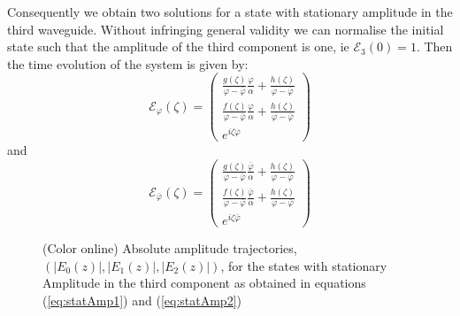 \documentclass[9pt,twocolumn,twoside]{osajnl}
\begin{document}
Consequently we obtain two solutions for a state with stationary amplitude in the third waveguide.
 Without infringing general validity we can normalise the initial state such that the amplitude of the third component is one, ie $\mathcal{E}_3(0)=1$.
 Then the time evolution of the system is given by:
\begin{equation} \label{eq:statAmp1}
\mathcal{E}_{\varphi}(\zeta)=\left( \begin{array}{c}
\frac{g(\zeta)}{\varphi -\bar{\varphi}}\frac{\varphi}{\alpha}+\frac{h(\zeta)}{\varphi -\bar{\varphi}} \\
\frac{f(\zeta)}{\varphi -\bar{\varphi}}\frac{\varphi}{\alpha}+\frac{h(\zeta)}{\varphi -\bar{\varphi}} \\
e^{i\zeta\varphi}
\end{array} \right)	
\end{equation}
and
\begin{equation} \label{eq:statAmp2}
\mathcal{E}_{\bar{\varphi}}(\zeta)=\left( \begin{array}{c}
\frac{g(\zeta)}{\varphi -\bar{\varphi}}\frac{\bar{\varphi}}{\alpha}+\frac{h(\zeta)}{\varphi -\bar{\varphi}} \\
\frac{f(\zeta)}{\varphi -\bar{\varphi}}\frac{\bar{\varphi}}{\alpha}+\frac{h(\zeta)}{\varphi -\bar{\varphi}} \\
e^{i\zeta\bar{\varphi}}
\end{array} \right)	
\end{equation}

\begin{figure}[htbp]
	\centering
	\caption{(Color online) Absolute amplitude trajectories, $(\vert E_{0}(z) \vert, \vert E_{1}(z) \vert, \vert E_{2}(z) \vert )$,  for the states with stationary 
		Amplitude in the third component 
		as obtained in equations (\ref{eq:statAmp1}) and (\ref{eq:statAmp2})}
	\label{fig: Fig5}
\end{figure}




\end{document}
